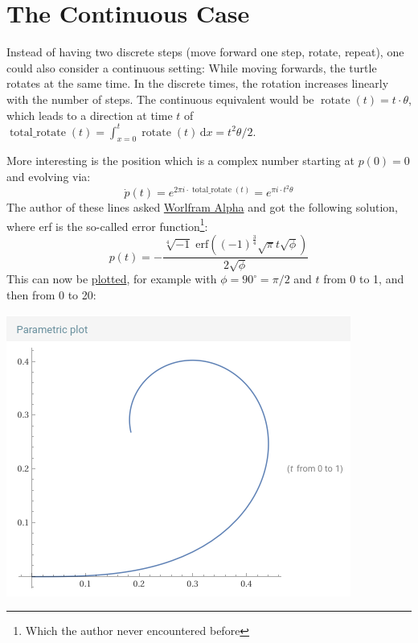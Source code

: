 \documentclass[pdftex,a4paper]{scrartcl}
\DeclareMathOperator{\rotate}{rotate}
\DeclareMathOperator{\total}{total\_rotate}
\begin{document}
\section{The Continuous Case}
Instead of having two discrete steps (move forward one step, rotate, repeat), one could also consider a continuous
setting: While moving forwards, the turtle rotates at the same time. In the discrete times, the rotation increases
linearly with the number of steps. The continuous equivalent would be \(\rotate(t)=t\cdot\theta\), which leads to a
direction at time \(t\) of \(\total(t)=\int_{x=0}^t\rotate(t)\,\text{d}x=t^2\theta/2\).

More interesting is the position which is a complex number starting at \(p(0)=0\) and evolving via:
\[
\dot{p}(t) = e^{2\pi i \cdot \total(t)} = e^{\pi i \cdot t^2\theta}
\]
The author of these lines asked
\href{https://www.wolframalpha.com/input?i=p%28t%29+%3D+integrate+e%5E%28pi+*+i+*+x%5E2+*+phi%29+from+x%3D0+to+t}{Worlfram Alpha}
and got the following solution, where erf is the so-called error function\footnote{Which the author never
encountered before}:
\[
p(t) = -\frac{\sqrt[4]{-1}\;\text{erf}((-1)^{\frac{3}{4}}\sqrt{\pi}t\sqrt{\phi})}{2\sqrt{\phi}}
\]
This can now be
\href{https://www.wolframalpha.com/input?i=parametric+plot%5BReal%28-%28%28-1%29%5E%281%2F4%29+erf%28%28-1%29%5E%283%2F4%29+sqrt%28pi%29+t+sqrt%28pi%2F2%29%29%29%2F%282+sqrt%28pi%2F2%29%29%29%2C+Imag%28-%28%28-1%29%5E%281%2F4%29+erf%28%28-1%29%5E%283%2F4%29+sqrt%28pi%29+t+sqrt%28pi%2F2%29%29%29%2F%282+sqrt%28pi%2F2%29%29%29%5D+for+t%3D0..20}{plotted},
for example with \(\phi=90^\circ=\pi/2\) and \(t\) from 0 to 1, and then from 0 to 20:

\includegraphics[width=\textwidth]{continuous1.png}
\end{document}
